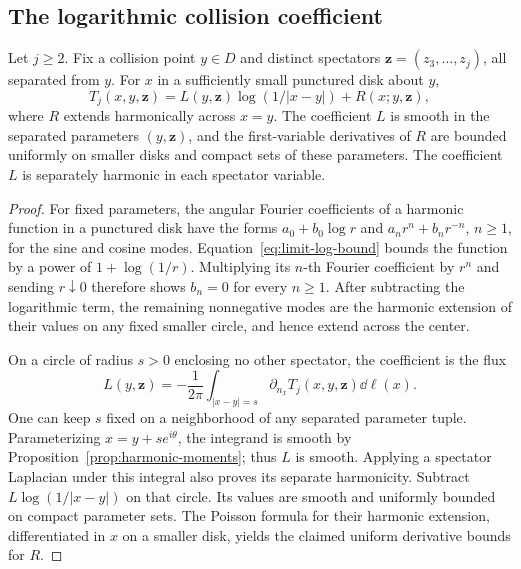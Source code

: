 \subsection{The logarithmic collision coefficient}

\begin{lemma}
\label{limit:puncture}
Let \(j\ge2\).  Fix a collision point \(y\in D\) and distinct spectators
\(\mathbf z=(z_3,\ldots,z_j)\), all separated from \(y\).
For \(x\) in a sufficiently small punctured disk about \(y\),
\begin{equation}
 T_j(x,y,\mathbf z)
      =L(y,\mathbf z)\log(1/|x-y|)
                           +R(x;y,\mathbf z),
 \label{eq:limit-puncture}
\end{equation}
where \(R\) extends harmonically across \(x=y\).
The coefficient \(L\) is smooth in the separated parameters
\((y,\mathbf z)\), and the first-variable derivatives of \(R\)
are bounded uniformly on smaller disks and compact sets of these
parameters.  The coefficient \(L\) is separately harmonic in each
spectator variable.
\end{lemma}

\begin{proof}
For fixed parameters, the angular Fourier coefficients of a harmonic
function in a punctured disk have the forms
\(a_0+b_0\log r\) and \(a_nr^n+b_nr^{-n}\), \(n\ge1\), for the
sine and cosine modes.  Equation~\eqref{eq:limit-log-bound} bounds
the function by a power of \(1+\log(1/r)\).  Multiplying its
\(n\)-th Fourier coefficient by \(r^n\) and sending \(r\downarrow0\)
therefore shows \(b_n=0\) for every \(n\ge1\).
After subtracting the logarithmic term, the remaining nonnegative
modes are the harmonic extension of their values on any fixed
smaller circle, and hence extend across the center.

On a circle of radius \(s>0\) enclosing no other spectator,
the coefficient is the flux
\begin{equation}
 L(y,\mathbf z)
   =-\frac1{2\pi}
       \int_{|x-y|=s}\partial_{n_x}T_j(x,y,\mathbf z)\dd\ell(x).
 \label{eq:limit-flux}
\end{equation}
One can keep \(s\) fixed on a neighborhood of any separated
parameter tuple.  Parameterizing \(x=y+se^{i\theta}\), the integrand
is smooth by Proposition~\ref{prop:harmonic-moments}; thus \(L\)
is smooth.  Applying a spectator Laplacian under this integral
also proves its separate harmonicity.
Subtract \(L\log(1/|x-y|)\) on that circle.  Its values are
smooth and uniformly bounded on compact parameter sets.
The Poisson formula for their harmonic extension, differentiated
in \(x\) on a smaller disk, yields the claimed uniform derivative
bounds for \(R\).
\end{proof}

